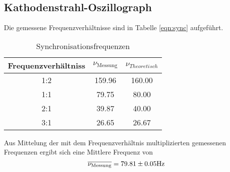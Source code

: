 \subsection{Kathodenstrahl-Oszillograph}
Die gemessene Frequenzverhältnisse sind in Tabelle \ref{eqn:sync} aufgeführt.
\begin{table}
  \centering
  \begin{tabular}{c c c}
    \toprule
    Frequenzverhältniss & $\nu_\text{Messung}$ & $\nu_{Theoretisch}$ \\
    \midrule
    1:2	& 159.96& 160.00\\
    1:1	& 79.75 & 80.00	\\
    2:1	& 39.87 & 40.00	\\
    3:1	& 26.65 & 26.67	\\
  \end{tabular}
  \caption{Synchronisationsfrequenzen}
  \label{tab:sync}
\end{table}
Aus Mittelung der mit dem Frequenzverhältnis multiplizierten gemessenen Frequenzen ergibt sich eine Mittlere Frequenz von
\begin{equation}
  \overline{\nu_\text{Messung}} = \num{79.81 +- 0.05} \text{Hz}
  \label{eqn:numess}
\end{equation}
